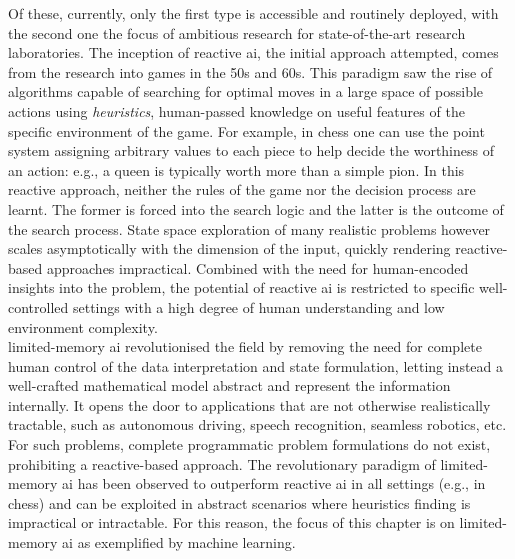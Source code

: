 Of these, currently, only the first type is accessible and routinely deployed, with the second one the focus of ambitious research for state-of-the-art research laboratories. The inception of reactive \gls{ai}, the initial approach attempted, comes from the research into games in the 50s and 60s. This paradigm saw the rise of algorithms capable of searching for optimal moves in a large space of possible actions using \textit{heuristics}, human-passed knowledge on useful features of the specific environment of the game. For example, in chess one can use the point system assigning arbitrary values to each piece to help decide the worthiness of an action: e.g., a queen is typically worth more than a simple pion. In this reactive approach, neither the rules of the game nor the decision process are learnt. The former is forced into the search logic and the latter is the outcome of the search process. State space exploration of many realistic problems however scales asymptotically with the dimension of the input, quickly rendering reactive-based approaches impractical. Combined with the need for human-encoded insights into the problem, the potential of reactive \gls{ai} is restricted to specific well-controlled settings with a high degree of human understanding and low environment complexity. \\

limited-memory \gls{ai} revolutionised the field by removing the need for complete human control of the data interpretation and state formulation, letting instead a well-crafted mathematical model abstract and represent the information internally. It opens the door to applications that are not otherwise realistically tractable, such as autonomous driving, speech recognition, seamless robotics, etc. For such problems, complete programmatic problem formulations do not exist, prohibiting a reactive-based approach. The revolutionary paradigm of limited-memory \gls{ai} has been observed to outperform reactive \gls{ai} in all settings (e.g., in chess) and can be exploited in abstract scenarios where heuristics finding is impractical or intractable. For this reason, the focus of this chapter is on limited-memory \gls{ai} as exemplified by machine learning. 

